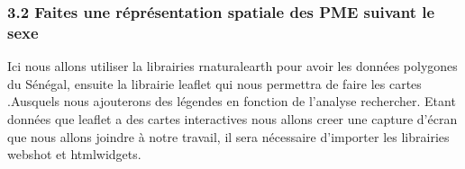 \documentclass[
]{article}
\begin{document}
\hypertarget{faites-une-ruxe9pruxe9sentation-spatiale-des-pme-suivant-le-sexe}{%
\subsubsection{3.2 Faites une réprésentation spatiale des PME suivant le
sexe}\label{faites-une-ruxe9pruxe9sentation-spatiale-des-pme-suivant-le-sexe}}

Ici nous allons utiliser la librairies rnaturalearth pour avoir les
données polygones du Sénégal, ensuite la librairie leaflet qui nous
permettra de faire les cartes .Ausquels nous ajouterons des légendes en
fonction de l'analyse rechercher. Etant données que leaflet a des cartes
interactives nous allons creer une capture d'écran que nous allons
joindre à notre travail, il sera nécessaire d'importer les librairies
webshot et htmlwidgets.
\end{document}
